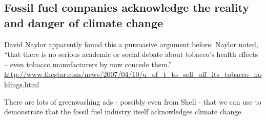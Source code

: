 	\subsection{Fossil fuel companies acknowledge the reality and danger of climate change}
	
\begin{vcom}
	David Naylor apparently found this a pursuasive argument before: Naylor noted, ``that there is no serious academic or social debate about tobacco's health effects – even tobacco manufacturers by now concede them.'' \url{http://www.thestar.com/news/2007/04/10/u_of_t_to_sell_off_its_tobacco_holdings.html}
	
	There are lots of greenwashing ads - possibly even from Shell - that we can use to demonstrate that the fossil fuel industry itself acknowledges climate change.
	
	
\end{vcom}


